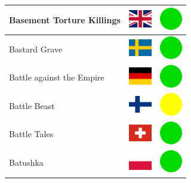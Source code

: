 \documentclass[12pt, a4paper, twoside]{report}
\begin{document}
\begin{center}
\begin{longtable}{|p{5cm}|p{2cm}|p{2cm}|}
 Basement Torture Killings                                  & \includegraphics[width=1cm]{../img/flags/gb} &   \includegraphics[width=1cm]{../likes/y} \\ \hline
 Bastard Grave                                              & \includegraphics[width=1cm]{../img/flags/se} &   \includegraphics[width=1cm]{../likes/y} \\ \hline
 Battle against the Empire                                  & \includegraphics[width=1cm]{../img/flags/de} &   \includegraphics[width=1cm]{../likes/y} \\ \hline
 Battle Beast                                               & \includegraphics[width=1cm]{../img/flags/fi} &   \includegraphics[width=1cm]{../likes/m} \\ \hline
 Battle Tales                                               & \includegraphics[width=1cm]{../img/flags/ch} &   \includegraphics[width=1cm]{../likes/y} \\ \hline
 Batushka                                                   & \includegraphics[width=1cm]{../img/flags/pl} &   \includegraphics[width=1cm]{../likes/y} \\ \hline

\end{longtable}
\end{center}
\end{document}
